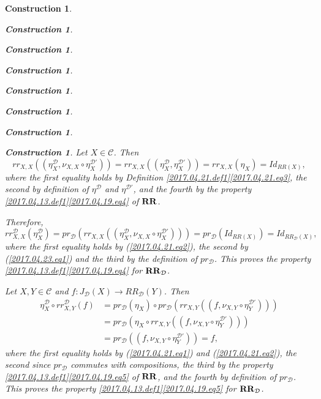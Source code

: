 \documentclass[onecolumn,12pt]{amsart}
\numberwithin{proposition}{subsection}
\newtheorem{construction}[proposition]{Construction}
\newcommand{\sr}{\rightarrow}
\newcommand{\RR}{{\bf RR}}
\newcommand{\C}{{\mathcal C}}
\newcommand{\D}{{\mathcal D}}
\begin{document}
\begin{construction}
\begin{construction}
\begin{construction}
\begin{construction}
\begin{construction}
\begin{construction}
\begin{construction}
\begin{construction}
Let $X\in\C$. Then
%
\begin{equation}
\label{2017.04.23.eq1}
rr_{X,X}((\eta^{\D}_X,\nu_{X,X}\circ \eta^{\D'}_X))=
rr_{X,X}((\eta^{\D}_X,\eta^{\D'}_X))=
rr_{X,X}(\eta_X)=
Id_{RR(X)},
\end{equation}%
%
where the first equality holds by Definition
\ref{2017.04.21.def1}\ref{2017.04.21.eq3}, the second by definition of
$\eta^{\D}$ and $\eta^{\D'}$, and the fourth by the property
\ref{2017.04.13.def1}\ref{2017.04.19.eq4} of $\RR$.

Therefore,
%
$$rr^{\D}_{X,X}(\eta^{\D}_X)=
pr_{\D}(rr_{X,X}((\eta^{\D}_X,\nu_{X,X}\circ \eta^{\D'}_X)))=
pr_{\D}(Id_{RR(X)})=Id_{RR_{\D}(X)},$$
%
where the first equality holds by (\ref{2017.04.21.eq2}), the second by
(\ref{2017.04.23.eq1}) and the third by the definition of $pr_{\D}$. This
proves the property \ref{2017.04.13.def1}\ref{2017.04.19.eq4} for $\RR_{\D}$.

Let $X,Y\in\C$ and $f:J_{\D}(X)\sr RR_{\D}(Y)$. Then
%
\begin{equation}
  \label{2017.04.23.eq2}
  \begin{split}
    \eta^{\D}_X\circ rr^{\D}_{X,Y}(f)
    &=pr_{\D}(\eta_X)\circ pr_{\D}(rr_{X,Y}((f,\nu_{X,Y}\circ \eta^{\D'}_Y)))
    \\
    &=pr_{\D}(\eta_X\circ rr_{X,Y}((f,\nu_{X,Y}\circ \eta^{\D'}_Y)))
    \\
    &=pr_{\D}((f,\nu_{X,Y}\circ \eta^{\D'}_Y))=f,
  \end{split}
\end{equation}%
%
where the first equality holds by (\ref{2017.04.21.eq1}) and
(\ref{2017.04.21.eq2}), the second since $pr_{\D}$ commutes with compositions,
the third by the property \ref{2017.04.13.def1}\ref{2017.04.19.eq5} of $\RR$,
and the fourth by definition of $pr_{\D}$. This proves the property
\ref{2017.04.13.def1}\ref{2017.04.19.eq5} for $\RR_{\D}$.


\end{construction}
\end{construction}
\end{construction}
\end{construction}
\end{construction}
\end{construction}
\end{construction}
\end{construction}
\end{document}

